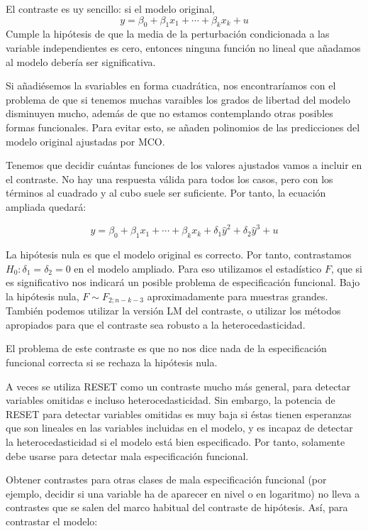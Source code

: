 El contraste es uy sencillo: si el modelo original,
\[y=\beta_0+\beta_1x_1+\cdots+\beta_kx_k+u\]
Cumple la hip\'otesis de que la media de la perturbaci\'on condicionada a las variable independientes es cero, entonces ninguna funci\'on no lineal que a\~nadamos al modelo deber\'ia ser significativa.

Si a\~nadi\'esemos la svariables en forma cuadr\'atica, nos encontrar\'iamos con el problema de que si tenemos muchas varaibles los grados de libertad del modelo disminuyen mucho, adem\'as de que no estamos contemplando otras posibles formas funcionales. Para evitar esto, se a\~naden polinomios de las predicciones del modelo original ajustadas por MCO.

Tenemos que decidir cu\'antas funciones de los valores ajustados vamos a incluir en el contraste. No hay una respuesta v\'alida para todos los casos, pero con los t\'erminos al cuadrado y al cubo suele ser suficiente. Por tanto, la ecuaci\'on ampliada quedar\'a:

\[y=\beta_0+\beta_1x_1+\cdots+\beta_kx_k+\delta_1\hat{y}^2+\delta_2\hat{y}^3+u\]

La hip\'otesis nula es que el modelo original es correcto. Por tanto, contrastamos $H_0:\delta_1=\delta_2=0$ en el modelo ampliado. Para eso utilizamos el estad\'istico $F$, que si es significativo nos indicar\'a un posible problema de especificaci\'on funcional. Bajo la hip\'otesis nula, $F\sim F_{2;n-k-3}$ aproximadamente para muestras grandes. Tambi\'en podemos utilizar la versi\'on LM del contraste, o utilizar los m\'etodos apropiados para que el contraste sea robusto a la heterocedasticidad.

El problema de este contraste es que no nos dice nada de la especificaci\'on funcional correcta si se rechaza la hip\'otesis nula.

A veces se utiliza RESET como un contraste mucho m\'as general, para detectar variables omitidas e incluso heterocedasticidad. Sin embargo, la potencia de RESET para detectar variables omitidas es muy baja si \'estas tienen esperanzas que son lineales en las variables incluidas en el modelo, y es incapaz de detectar la heterocedasticidad si el modelo est\'a bien especificado. Por tanto, solamente debe usarse para detectar mala especificaci\'on funcional.



Obtener contrastes para otras clases de mala especificaci\'on funcional (por ejemplo, decidir si una variable ha de aparecer en nivel o en logaritmo) no lleva a contrastes que se salen del marco habitual del contraste de hip\'otesis. As\'i, para contrastar el modelo:

